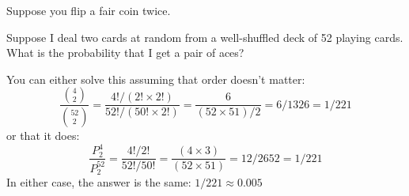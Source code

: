 \documentclass[addpoints,12pt]{exam}
\begin{document}
\begin{questions}

\question Suppose you flip a fair coin twice.

\question Suppose I deal two cards at random from a well-shuffled deck of 52 playing cards. What is the probability that I get a pair of aces? 
	\begin{solution}
	You can either solve this assuming that order doesn't matter:
		$$\frac{\binom{4}{2}}{\binom{52}{2}} = \frac{4!/(2!\times 2!)}{52!/(50!  \times 2!)} = \frac{6}{(52\times 51)/2}= 6/1326 = 1/221$$
		or that it does:
		$$\frac{P^4_2}{P^{52}_2} = \frac{4!/2!}{52!/50!} =\frac{(4\times 3)}{(52\times 51)} = 12/2652 = 1/221$$
		In either case, the answer is the same: $1/221  \approx 0.005$
	\end{solution}


\end{questions}
\end{document}
